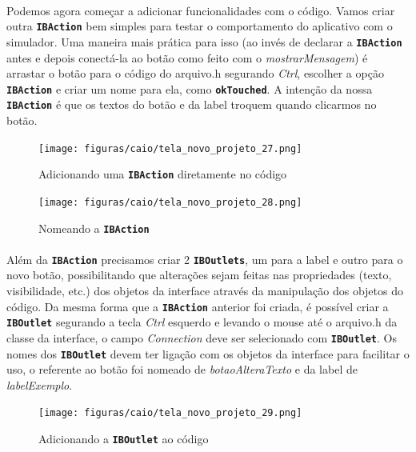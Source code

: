 \documentclass[a4paper,12pt,brazil,doubleside]{book}
\begin{document}
\begin{singlespace}
\bigskip

\paragraph{}Podemos agora começar a adicionar funcionalidades com o código. Vamos criar outra \texttt{\textbf{IBAction}} bem simples para testar o comportamento do aplicativo com o simulador. Uma maneira mais prática para isso (ao invés de declarar a \texttt{\textbf{IBAction}} antes e depois conectá-la ao botão como feito com o \emph{mostrarMensagem}) é arrastar o botão para o código do arquivo.h segurando \emph{Ctrl}, escolher a opção \texttt{\textbf{IBAction}} e criar um nome para ela, como \texttt{\textbf{okTouched}}. A intenção da nossa \texttt{\textbf{IBAction}} é que os textos do botão e da label troquem quando clicarmos no botão.

\begin{figure}[H]
  \centering
  \texttt{[image: figuras/caio/tela\_novo\_projeto\_27.png]}
  \caption{Adicionando uma \texttt{\textbf{IBAction}} diretamente no código}
  \label{fig:a}
\end{figure}

\begin{figure}[H]
  \centering
  \texttt{[image: figuras/caio/tela\_novo\_projeto\_28.png]}
  \caption{Nomeando a \texttt{\textbf{IBAction}}}
  \label{fig:a}
\end{figure}

\paragraph{}Além da \texttt{\textbf{IBAction}} precisamos criar 2 \texttt{\textbf{IBOutlets}}, um para a label e outro para o novo botão, possibilitando que alterações sejam feitas nas propriedades (texto, visibilidade, etc.) dos objetos da interface através da manipulação dos objetos do código.
Da mesma forma que a \texttt{\textbf{IBAction}} anterior foi criada, é possível criar a \texttt{\textbf{IBOutlet}} segurando a tecla \emph{Ctrl} esquerdo e levando o mouse até o arquivo.h da classe da interface, o campo \emph{Connection} deve ser selecionado com \texttt{\textbf{IBOutlet}}.
Os nomes dos  \texttt{\textbf{IBOutlet}} devem ter ligação com os objetos da interface para facilitar o uso, o referente ao botão foi nomeado de \emph{botaoAlteraTexto} e da label de \emph{labelExemplo}.

\begin{figure}[H]
  \centering
  \texttt{[image: figuras/caio/tela\_novo\_projeto\_29.png]}
  \caption{Adicionando a \texttt{\textbf{IBOutlet}} ao código}
  \label{fig:a}
\end{figure}


\end{singlespace}
\end{document}
